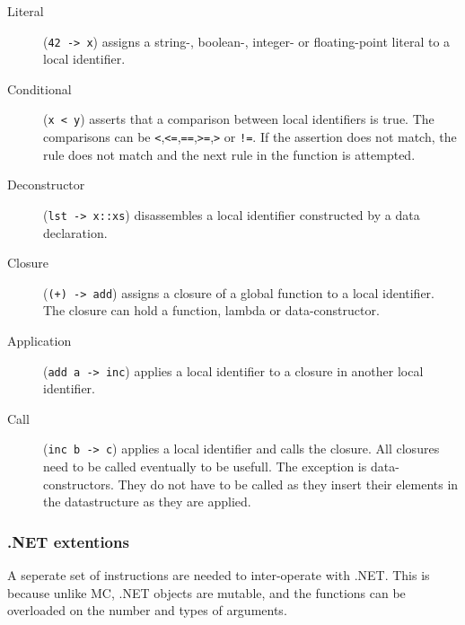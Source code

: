 \begin{description}
\item[Literal] (\verb|42 -> x|) assigns a string-, boolean-, integer- or floating-point literal to a local identifier.
\item[Conditional] (\verb|x < y|) asserts that a comparison between local identifiers is true.
    The comparisons can be \verb|<|,\verb|<=|,\verb|==|,\verb|>=|,\verb|>| or \verb|!=|.
    If the assertion does not match, the rule does not match and the next rule in the function is attempted.
\item[Deconstructor] (\verb|lst -> x::xs|) disassembles a local identifier constructed by a data declaration.
\item[Closure] (\verb|(+) -> add|) assigns a closure of a global function to a local identifier.
    The closure can hold a function, lambda or data-constructor.
\item[Application] (\verb|add a -> inc|) applies a local identifier to a closure in another local identifier.
\item[Call] (\verb|inc b -> c|) applies a local identifier and calls the closure.
    All closures need to be called eventually to be usefull.
    The exception is data-constructors. 
    They do not have to be called as they insert their elements in the datastructure as they are applied.
\end{description}

\subsubsection{.NET extentions}
A seperate set of instructions are needed to inter-operate with .NET.
This is because unlike MC, .NET objects are mutable, and the functions can be overloaded on the number and types of arguments.

